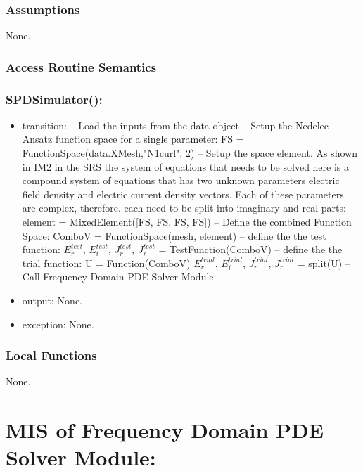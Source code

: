 \documentclass[12pt, titlepage]{article}
\begin{document}
\subsubsection{Assumptions}
None.

\subsubsection{Access Routine Semantics}

\subsubsection*{SPDSimulator():}
\begin{itemize}
	\item transition: 
	\subitem -- Load the inputs from the data object
	\subitem -- Setup the Nedelec Ansatz function space for a single parameter: 
	\subsubitem FS = FunctionSpace(data.XMesh,"N1curl", 2)
	\subitem -- Setup the space element. As shown in IM2 in the SRS the system of equations that needs to be solved here is a compound system of equations that has two unknown parameters electric field density and electric current density vectors. Each of these parameters are complex, therefore. each need to be split into imaginary and real parts: 
	\subsubitem element = MixedElement([FS, FS, FS, FS])
	\subitem -- Define the combined Function Space:
	\subsubitem  ComboV = FunctionSpace(mesh, element)
	\subitem -- define the the test function: 
	\subsubitem $E^{test}_r$, $E^{test}_i$, $J^{test}_r$, $J^{test}_r$ = TestFunction(ComboV) 
	\subitem -- define the the trial function: 
	\subsubitem U = Function(ComboV)
	\subsubitem $E^{trial}_r$, $E^{trial}_i$, $J^{trial}_r$, $J^{trial}_r$ = split(U) 
	\subitem -- Call Frequency Domain PDE Solver Module
	\item output: None. 
	\item exception: None.
\end{itemize}

\subsubsection{Local Functions}
None.



\newpage
%
%
%
%
\section{MIS of Frequency Domain PDE Solver Module:} \label{GRM} 
\end{document}
